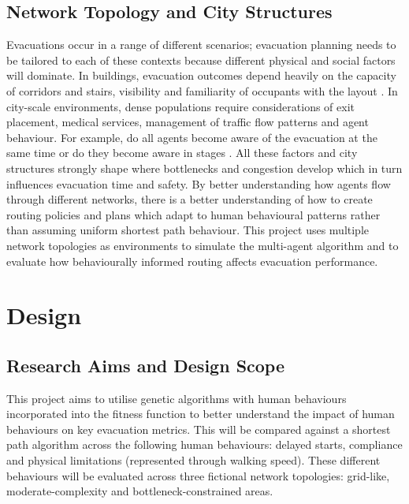 \documentclass[12pt,a4paper]{report}
\begin{document}
\section{Network Topology and City Structures}
Evacuations occur in a range of different scenarios; evacuation planning needs to be tailored to each of these contexts because different physical and social factors will dominate. In buildings, evacuation outcomes depend heavily on the capacity of corridors and stairs, visibility and familiarity of occupants with the layout \citep{FU_2024_LAYOUT}. In city-scale environments, dense populations require considerations of exit placement, medical services, management of traffic flow patterns and agent behaviour. For example, do all agents become aware of the evacuation at the same time or do they become aware in stages \citep{LEON_2019_DELAYS,BOROWSKA_STEFANSKA_2025_LAYOUT}. All these factors and city structures strongly shape where bottlenecks and congestion develop which in turn influences evacuation time and safety. By better understanding how agents flow through different networks, there is a better understanding of how to create routing policies and plans which adapt to human behavioural patterns rather than assuming uniform shortest path behaviour. This project uses multiple network topologies as environments to simulate the multi-agent algorithm and to evaluate how behaviourally informed routing affects evacuation performance.


\chapter{Design}

\section{Research Aims and Design Scope}
This project aims to utilise genetic algorithms with human behaviours incorporated into the fitness function to better understand the impact of human behaviours on key evacuation metrics. This will be compared against a shortest path algorithm across the following human behaviours: delayed starts, compliance and physical limitations (represented through walking speed). These different behaviours will be evaluated across three fictional network topologies: grid-like, moderate-complexity and bottleneck-constrained areas. 
\end{document}
